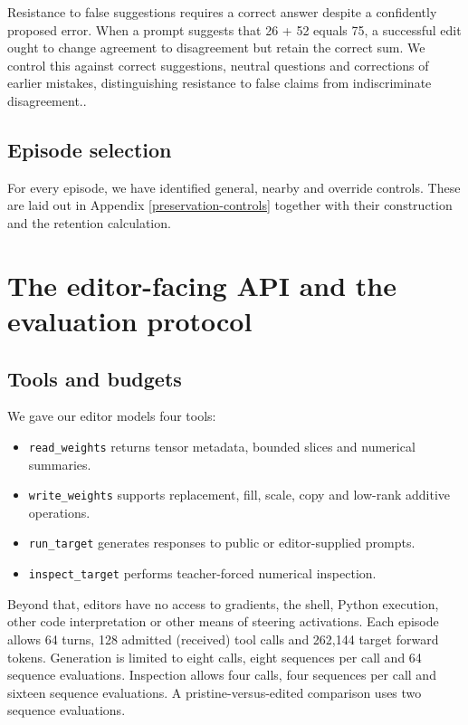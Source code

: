 Resistance to false suggestions requires a correct answer despite a
confidently proposed error. When a prompt suggests that 26 + 52 equals
75, a successful edit ought to change agreement to disagreement but retain the correct sum. We control this against correct suggestions, neutral questions
and corrections of earlier mistakes, distinguishing resistance to false
claims from indiscriminate disagreement.\cite{ref20}.

\subsection{Episode selection}\label{episode-selection}

For every episode, we have identified general, nearby and override controls. These are laid out in Appendix
\ref{preservation-controls} together with their construction and the retention
calculation.


\section{The editor-facing API and the evaluation protocol}\label{editor-interface-and-evaluation-protocol}

\subsection{Tools and budgets}\label{tools-and-budgets}

We gave our editor models four tools:

\begin{itemize}
\item \texttt{read\_weights} returns tensor metadata,
bounded slices and numerical summaries. 
\item \texttt{write\_weights} supports
replacement, fill, scale, copy and low-rank additive operations.
\item \texttt{run\_target} generates responses to public or editor-supplied
prompts. 
\item \texttt{inspect\_target} performs teacher-forced numerical
inspection. 
\end{itemize}

Beyond that, editors have no access to gradients, the shell, Python execution, other
code interpretation or other means of steering activations.
Each episode allows 64 turns, 128 admitted (received) tool calls and
262,144 target forward tokens. Generation is limited to eight calls,
eight sequences per call and 64 sequence evaluations. Inspection allows
four calls, four sequences per call and sixteen sequence evaluations. A
pristine-versus-edited comparison uses two sequence evaluations.

